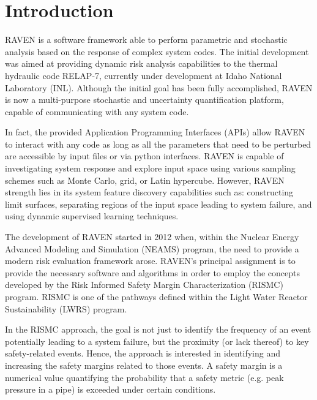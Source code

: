 \section{Introduction}

RAVEN is a software framework able to perform parametric and stochastic
analysis based on the response of complex system codes.
%
The initial development was aimed at providing dynamic risk analysis
capabilities to the thermal hydraulic code RELAP-7, currently under development
at Idaho National Laboratory (INL).
%
Although the initial goal has been fully accomplished, RAVEN is now a
multi-purpose stochastic and uncertainty quantification platform, capable of
 communicating with any system code.

In fact, the provided Application Programming
Interfaces (APIs) allow RAVEN to interact with any code as long as all the parameters
that need to be perturbed are accessible by input files or via python
interfaces.
%
RAVEN is capable of investigating system response and explore input space using various
sampling schemes such as Monte Carlo, grid, or Latin hypercube.
%
However, RAVEN strength lies in its system feature discovery capabilities such as: constructing
limit surfaces, separating regions of the input space leading to system failure,
and using dynamic supervised learning techniques.

The development of RAVEN started in 2012 when, within the Nuclear Energy
Advanced Modeling and Simulation (NEAMS) program, the need to provide a modern
risk evaluation framework arose.
%
RAVEN's principal assignment is to provide the necessary software and algorithms
in order to employ the concepts developed by the Risk Informed Safety Margin
Characterization (RISMC) program.
%
RISMC is one of the pathways defined within the Light Water Reactor
Sustainability (LWRS) program.

In the RISMC approach, the goal is not just to identify the frequency of an
event potentially leading to a system failure, but the proximity (or lack
thereof) to key safety-related events.
%
Hence, the approach is interested in identifying and increasing the safety
margins related to those events.
%
A safety margin is a numerical value quantifying the probability that a safety
metric (e.g. peak pressure in a pipe) is exceeded under certain conditions.

